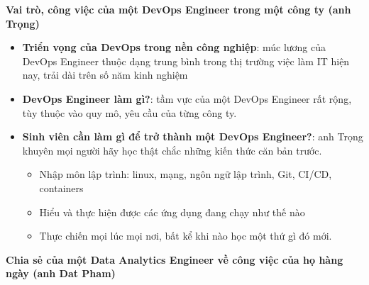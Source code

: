 \vspace{0.5em}\noindent\textbf{Vai trò, công việc của một DevOps Engineer trong một công ty
(anh
Trọng)}\par

\begin{itemize}
\tightlist
\item
  \textbf{Triển vọng của DevOps trong nền công nghiệp}: múc lương của
  DevOps Engineer thuộc dạng trung bình trong thị trường việc làm IT
  hiện nay, trải dài trên số năm kinh nghiệm
\item
  \textbf{DevOps Engineer làm gì?}: tầm vực của một DevOps Engineer rất
  rộng, tùy thuộc vào quy mô, yêu cầu của từng công ty.
\item
  \textbf{Sinh viên cần làm gì để trở thành một DevOps Engineer?}: anh
  Trọng khuyên mọi người hãy học thật chắc những kiến thức căn bản
  trước.

  \begin{itemize}
  \tightlist
  \item
    Nhập môn lập trình: linux, mạng, ngôn ngữ lập trình, Git, CI/CD,
    containers
  \item
    Hiểu và thực hiện được các ứng dụng đang chạy như thế nào
  \item
    Thực chiến mọi lúc mọi nơi, bất kể khi nào học một thứ gì đó mới.
  \end{itemize}
\end{itemize}

\vspace{0.5em}\noindent\textbf{Chia sẻ của một Data Analytics Engineer về công việc của họ
hàng ngày (anh Dat
Pham)}\par

